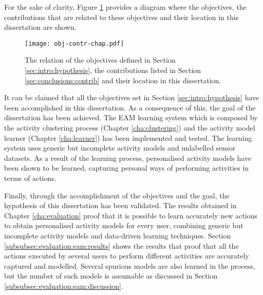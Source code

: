 For the sake of clarity, Figure \ref{fig-obj-contr-chap} provides a diagram where the objectives, the contributions that are related to these objectives and their location in this dissertation are shown.

\begin{figure}[htbp]
\centering
\texttt{[image: obj-contr-chap.pdf]}
    \caption{The relation of the objectives defined in Section \ref{sec:intro:hypothesis}, the contributions listed in Section \ref{sec:conclusions:contrib} and their location in this dissertation.}
    \label{fig-obj-contr-chap}
\end{figure}

It can be claimed that all the objectives set in Section \ref{sec:intro:hypothesis} have been accomplished in this dissertation. As a consequence of this, the goal of the dissertation has been achieved. The EAM learning system which is composed by the activity clustering process (Chapter \ref{cha:clustering}) and the activity model learner (Chapter \ref{cha:learner}) has been implemented and tested. The learning system uses generic but incomplete activity models and unlabelled sensor datasets. As a result of the learning process, personalised activity models have been shown to be learned, capturing personal ways of performing activities in terms of actions.

Finally, through the accomplishment of the objectives and the goal, the hypothesis of this dissertation has been validated. The results obtained in Chapter \ref{cha:evaluation} proof that it is possible to learn accurately new actions to obtain personalised activity models for every user, combining generic but incomplete activity models and data-driven learning techniques. Section \ref{subsubsec:evaluation:eam:results} shows the results that proof that all the actions executed by several users to perform different activities are accurately captured and modelled. Several spurious models are also learned in the process, but the number of such models is assumable as discussed in Section \ref{subsubsec:evaluation:eam:discussion}.